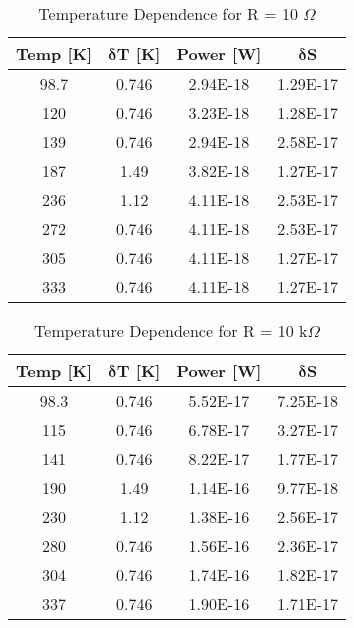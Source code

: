 \begin{table}[H]
	\centering
	\begin{tabular}{c c c c} \toprule
		\textbf{Temp [K]} & $\mathbf{\delta}$\textbf{T [K]} & \textbf{Power [W]} & $\mathbf{\delta}$\textbf{S} \\ \toprule
		98.7 & 0.746 & 2.94E-18 & 1.29E-17 \\
		120  & 0.746 & 3.23E-18 & 1.28E-17 \\
		139  & 0.746 & 2.94E-18 & 2.58E-17 \\
		187  & 1.49  & 3.82E-18 & 1.27E-17 \\
		236  & 1.12  & 4.11E-18 & 2.53E-17 \\
		272  & 0.746 & 4.11E-18 & 2.53E-17 \\
		305  & 0.746 & 4.11E-18 & 1.27E-17 \\
		333  & 0.746 & 4.11E-18 & 1.27E-17 \\
		\bottomrule  
	\end{tabular}
	\caption{Temperature Dependence for R = 10 $\Omega$}
	\label{temp10}
\end{table}



\begin{table}[H]
	\centering
	\begin{tabular}{c c c c} \toprule
		\textbf{Temp [K]} & $\mathbf{\delta}$\textbf{T [K]} & \textbf{Power [W]} & $\mathbf{\delta}$\textbf{S} \\ \toprule
		98.3 & 0.746 & 5.52E-17 & 7.25E-18 \\
		115  & 0.746 & 6.78E-17 & 3.27E-17 \\
		141  & 0.746 & 8.22E-17 & 1.77E-17 \\
		190  & 1.49  & 1.14E-16 & 9.77E-18 \\
		230  & 1.12  & 1.38E-16 & 2.56E-17 \\
		280  & 0.746 & 1.56E-16 & 2.36E-17 \\
		304  & 0.746 & 1.74E-16 & 1.82E-17 \\
		337  & 0.746 & 1.90E-16 & 1.71E-17 \\
		\bottomrule
	\end{tabular}
\caption{Temperature Dependence for R = 10 k$\Omega$}
\label{temp10k}
\end{table}



